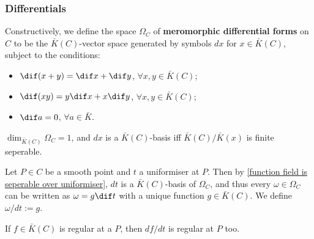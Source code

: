 \subsubsection*{Differentials}
Constructively, we define the space $\Omega_C$ of \textbf{meromorphic differential forms} on $C$ to be the $\bar{K}(C)$-vector space generated by symbols $dx$ for $x\in \bar{K}(C)$, subject to the conditions:\begin{itemize}
    \item $\dif(x + y) = \dif x + \dif y$, $\forall x, y\in \bar{K}(C)$;
    \item $\dif(xy) = y\dif x + x\dif y$, $\forall x, y\in\bar{K}(C)$;
    \item $\dif a = 0$, $\forall a\in\bar{K}$.
\end{itemize}

\begin{proposition}
    $\dim_{\bar{K}(C)} \Omega_C = 1$, and $dx$ is a $\bar{K}(C)$-basis iff $\bar{K}(C)/\bar{K}(x)$ is finite seperable.
\end{proposition}

Let $P\in C$ be a smooth point and $t$ a uniformiser at $P$.
Then by \cref{function field is seperable over uniformiser}, $dt$ is a $\bar{K}(C)$-basis of $\Omega_C$, and thus every $\omega\in\Omega_C$ can be written as $\omega = g\dif t$ with a unique function $g\in \bar{K}(C)$. We define $\omega/dt := g$.

\begin{proposition}\label{differential of regular is regular}
    If $f\in \bar{K}(C)$ is regular at a $P$, then $df/dt$ is regular at $P$ too.
\end{proposition}

